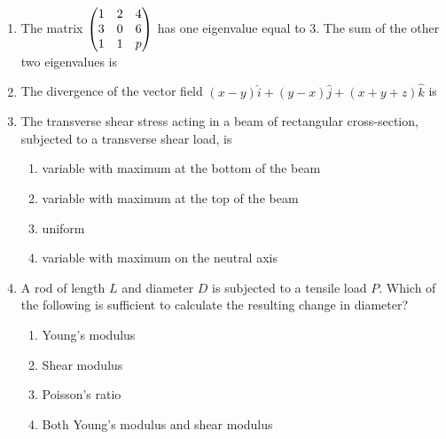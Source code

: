 \documentclass[journal,12pt,onecolumn]{IEEEtran}
\begin{document}
\begin{enumerate}
    \item The matrix $\begin{pmatrix}1 & 2 & 4 \\3 & 0 & 6 \\1 & 1 & p\end{pmatrix}$ has one eigenvalue equal to 3. The sum of the other two eigenvalues is
          \begin{enumerate}
          \end{enumerate}

    \item The divergence of the vector field $(x-y)\hat{i} + (y-x)\hat{j} + (x+y+z)\hat{k}$ is
          \begin{enumerate}
          \end{enumerate}

    \item The transverse shear stress acting in a beam of rectangular cross-section, subjected to a transverse shear load, is
          \begin{enumerate}
              \item variable with maximum at the bottom of the beam
              \item variable with maximum at the top of the beam
              \item uniform
              \item variable with maximum on the neutral axis
          \end{enumerate}

    \item A rod of length $L$ and diameter $D$ is subjected to a tensile load $P$. Which of the following is sufficient to calculate the resulting change in diameter?
          \begin{enumerate}
              \item Young's modulus
              \item Shear modulus
              \item Poisson's ratio
              \item Both Young's modulus and shear modulus
          \end{enumerate}


\end{enumerate}
\end{document}
